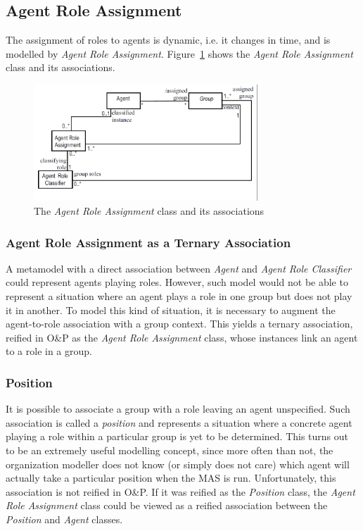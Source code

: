 \subsection{Agent Role Assignment}

The assignment of roles to agents is dynamic, i.e. it changes in time, and is modelled by \textit{Agent Role Assignment}.
Figure~\ref{figure:onp-agent-role-assignment} shows the \textit{Agent Role Assignment} class and its associations.

\begin{figure}[ht]
	\centering
	\includegraphics[width=0.75\textwidth]{images/onp/agent-role-assignment.png}
	\caption{The \textit{Agent Role Assignment} class and its associations \cite{Odell05}}
	\label{figure:onp-agent-role-assignment}
\end{figure}

\subsubsection*{Agent Role Assignment as a Ternary Association}

A metamodel with a direct association between \textit{Agent} and \textit{Agent Role Classifier} could represent agents playing roles.
However, such model would not be able to represent a situation where an agent plays a role in one group but does not play it in another.
To model this kind of situation, it is necessary to augment the agent-to-role association with a group context.
This yields a ternary association, reified in O\&P as the \textit{Agent Role Assignment} class, whose instances link an agent to a role in a group.

\subsubsection*{Position}

It is possible to associate a group with a role leaving an agent unspecified.
Such association is called a \textit{position} and represents a situation where a concrete agent playing a role within a particular group is yet to be determined.
This turns out to be an extremely useful modelling concept, since more often than not, the organization modeller does not know (or simply does not care) which agent will actually take a particular position when the MAS is run.
Unfortunately, this association is not reified in O\&P.
If it was reified as the \textit{Position} class, the \textit{Agent Role Assignment} class could be viewed as a reified association between the \textit{Position} and \textit{Agent} classes.